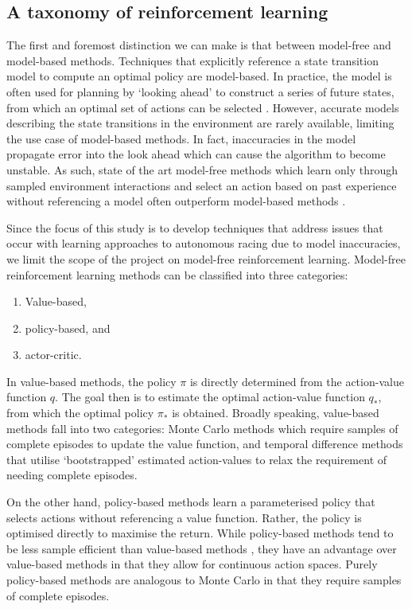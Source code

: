 \subsection{A taxonomy of reinforcement learning}
The first and foremost distinction we can make is that between model-free and model-based methods.
Techniques that explicitly reference a state transition model to compute an optimal policy are model-based.
In practice, the model is often used for planning by `looking ahead' to construct a series of future states, from which an optimal set of actions can be selected \cite{moerland2020}.
However, accurate models describing the state transitions in the environment are rarely available, limiting the use case of model-based methods. 
In fact, inaccuracies in the model propagate error into the look ahead which can cause the algorithm to become unstable.
As such, state of the art model-free methods which learn only through sampled environment interactions and select an action based on past experience without referencing a model often outperform model-based methods \cite{seita2019}.

Since the focus of this study is to develop techniques that address issues that occur with learning approaches to autonomous racing due to model inaccuracies, we limit the scope of the project on model-free reinforcement learning. 
Model-free reinforcement learning methods can be classified into three categories: 
\begin{enumerate}
    \item Value-based, 
    \item policy-based, and
    \item actor-critic.
\end{enumerate}
In value-based methods, the policy $\pi$ is directly determined from the action-value function $q$. The goal then is to estimate the optimal action-value function $q_*$, from which the optimal policy $\pi_*$ is obtained. 
Broadly speaking, value-based methods fall into two categories: Monte Carlo methods which require samples of complete episodes to update the value function, and temporal difference methods that utilise `bootstrapped' estimated action-values to relax the requirement of needing complete episodes.

On the other hand, policy-based methods learn a parameterised policy that selects actions without referencing a value function.
Rather, the policy is optimised directly to maximise the return. While policy-based methods tend to be less sample efficient than value-based methods \cite{nachum2017}, they have an advantage over value-based methods in that they allow for continuous action spaces. Purely policy-based methods are analogous to Monte Carlo in that they require samples of complete episodes.

